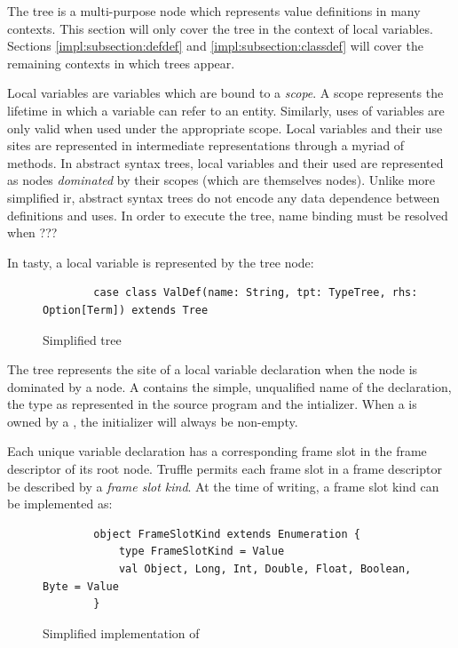 The  tree is a multi-purpose node which represents value definitions in many contexts.
This section will only cover the  tree in the context of local variables.
Sections \ref{impl:subsection:defdef} and \ref{impl:subsection:classdef} will cover the remaining contexts in which  trees appear.

Local variables are variables which are bound to a \textit{scope}. 
A scope represents the lifetime in which a variable can refer to an entity. 
Similarly, uses of variables are only valid when used under the appropriate scope. 
Local variables and their use sites are represented in intermediate representations through a myriad of methods. 
In abstract syntax trees, local variables and their used are represented as nodes \textit{dominated} by their scopes (which are themselves nodes). 
Unlike more simplified \acrshort{ir}, abstract syntax trees do not encode any data dependence between definitions and uses\cite{ssa}. 
In order to execute the tree, name binding must be resolved when ???

In \acrshort{tasty}, a local variable is represented by the  tree node:

\begin{figure}[H]
	\begin{verbatim}
		case class ValDef(name: String, tpt: TypeTree, rhs: Option[Term]) extends Tree 
	\end{verbatim}
	\caption{Simplified  tree}
\end{figure}

The  tree represents the site of a local variable declaration when the node is dominated by a  node. 
A  contains the simple, unqualified name of the declaration, the type as represented in the source program and the intializer. 
When a  is owned by a , the initializer will always be non-empty.

Each unique variable declaration has a corresponding frame slot in the frame descriptor of its root node. 
Truffle permits each frame slot in a frame descriptor be described by a \textit{frame slot kind}.
At the time of writing, a frame slot kind can be implemented as:

\begin{figure}[H]
	\begin{verbatim}
		object FrameSlotKind extends Enumeration {
			type FrameSlotKind = Value
			val Object, Long, Int, Double, Float, Boolean, Byte = Value
		}
	\end{verbatim}
	\caption{Simplified implementation of }
\end{figure}


